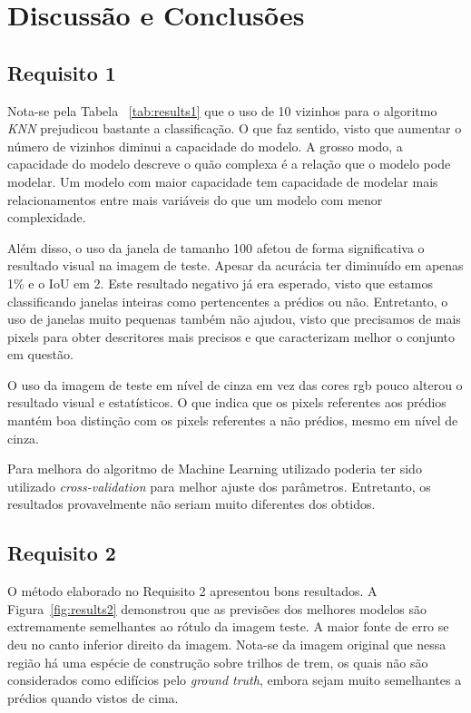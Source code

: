 \documentclass{bmvc2k}
\begin{document}
\section{Discussão e Conclusões}
\label{sec:conc}
\subsection{Requisito 1}
Nota-se pela Tabela ~\ref{tab:results1} que o uso de 10 vizinhos para o algoritmo \textit{KNN} prejudicou bastante a classificação. O que faz sentido, visto que aumentar o número de vizinhos diminui a capacidade do modelo. A grosso modo, a capacidade do modelo descreve o quão complexa é a relação que o modelo pode modelar. Um modelo com maior capacidade tem capacidade de modelar mais relacionamentos entre mais variáveis do que um modelo com menor complexidade.

Além disso, o uso da janela de tamanho 100 afetou de forma significativa o resultado visual na imagem de teste. Apesar da acurácia ter diminuído em apenas 1\% e o IoU em 2. Este resultado negativo já era esperado, visto que estamos classificando janelas inteiras como pertencentes a prédios ou não. Entretanto, o uso de janelas muito pequenas também não ajudou, visto que precisamos de mais pixels para obter descritores mais precisos e que caracterizam melhor o conjunto em questão.

O uso da imagem de teste em nível de cinza em vez das cores rgb pouco alterou o resultado visual e estatísticos. O que indica que os pixels referentes aos prédios mantém boa distinção com os pixels referentes a não prédios, mesmo em nível de cinza.

Para melhora do algoritmo de Machine Learning utilizado poderia ter sido utilizado \textit{cross-validation} para melhor ajuste dos parâmetros. Entretanto, os resultados provavelmente não seriam muito diferentes dos obtidos.

\subsection{Requisito 2}
O método elaborado no Requisito 2 apresentou bons resultados. A Figura~\ref{fig:results2} demonstrou que as previsões dos melhores modelos são extremamente semelhantes ao rótulo da imagem teste. A maior fonte de erro se deu no canto inferior direito da imagem. Nota-se da imagem  original que nessa região há uma espécie de construção sobre trilhos de trem, os quais não são considerados como edifícios pelo \textit{ground truth}, embora sejam muito semelhantes a prédios quando vistos de cima.
\end{document}

